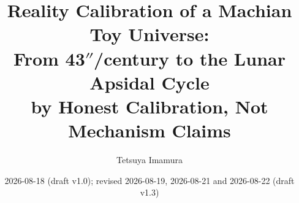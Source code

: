 \documentclass[aps,reprint,amsmath,amssymb,nofootinbib,superscriptaddress,floatfix]{revtex4-2}
\begin{document}
\title{\texorpdfstring{Reality Calibration of a Machian Toy Universe:\\
From 43$''$/century to the Lunar Apsidal Cycle\\
by Honest Calibration, Not Mechanism Claims}%
{Reality Calibration of a Machian Toy Universe: From 43 arcsec/century to the Lunar Apsidal Cycle by Honest Calibration, Not Mechanism Claims}}

\author{Tetsuya Imamura}

\date{2026-08-18 (draft v1.0); revised 2026-08-19, 2026-08-21 and
  2026-08-22 (draft v1.3)}
\end{document}
